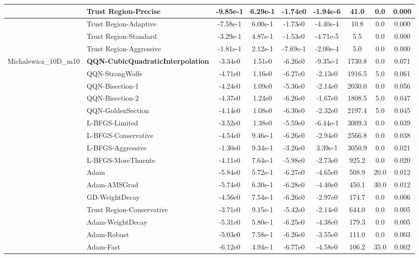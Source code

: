 \documentclass{article}
\begin{document}
\begin{longtable}{|l|l|c|c|c|c|c|c|c|}
\hline
 & Trust Region-Precise & -9.85e-1 & 6.29e-1 & -1.74e0 & -1.94e-6 & 41.0 & 0.0 & 0.000 \\
\hline
 & Trust Region-Adaptive & -7.58e-1 & 6.00e-1 & -1.73e0 & -4.40e-4 & 10.8 & 0.0 & 0.000 \\
\hline
 & Trust Region-Standard & -3.29e-1 & 4.87e-1 & -1.53e0 & -4.71e-5 & 5.5 & 0.0 & 0.000 \\
\hline
 & Trust Region-Aggressive & -1.81e-1 & 2.12e-1 & -7.69e-1 & -2.00e-4 & 5.0 & 0.0 & 0.000 \\
Michalewicz\_10D\_m10 & \textbf{QQN-CubicQuadraticInterpolation} & -3.34e0 & 1.51e0 & -6.26e0 & -9.35e-1 & 1730.8 & 0.0 & 0.071 \\
\hline
 & QQN-StrongWolfe & -4.71e0 & 1.16e0 & -6.27e0 & -2.13e0 & 1916.5 & 5.0 & 0.061 \\
\hline
 & QQN-Bisection-1 & -4.24e0 & 1.09e0 & -5.36e0 & -2.14e0 & 2030.0 & 0.0 & 0.056 \\
\hline
 & QQN-Bisection-2 & -4.37e0 & 1.24e0 & -6.26e0 & -1.67e0 & 1808.5 & 5.0 & 0.047 \\
\hline
 & QQN-GoldenSection & -4.14e0 & 1.08e0 & -6.30e0 & -2.32e0 & 2197.4 & 5.0 & 0.045 \\
\hline
 & L-BFGS-Limited & -3.52e0 & 1.38e0 & -5.59e0 & -6.44e-1 & 3009.3 & 0.0 & 0.039 \\
\hline
 & L-BFGS-Conservative & -4.54e0 & 9.46e-1 & -6.26e0 & -2.94e0 & 2566.8 & 0.0 & 0.038 \\
\hline
 & L-BFGS-Aggressive & -1.30e0 & 9.34e-1 & -3.26e0 & 3.39e-1 & 3050.9 & 0.0 & 0.021 \\
\hline
 & L-BFGS-MoreThuente & -4.11e0 & 7.64e-1 & -5.98e0 & -2.73e0 & 925.2 & 0.0 & 0.020 \\
\hline
 & Adam & -5.84e0 & 5.72e-1 & -6.27e0 & -4.65e0 & 508.9 & 20.0 & 0.012 \\
\hline
 & Adam-AMSGrad & -5.74e0 & 6.30e-1 & -6.28e0 & -4.40e0 & 450.1 & 30.0 & 0.012 \\
\hline
 & GD-WeightDecay & -4.56e0 & 7.54e-1 & -6.26e0 & -2.97e0 & 174.7 & 0.0 & 0.006 \\
\hline
 & Trust Region-Conservative & -3.71e0 & 9.15e-1 & -5.42e0 & -2.14e0 & 644.0 & 0.0 & 0.005 \\
\hline
 & Adam-WeightDecay & -5.31e0 & 5.80e-1 & -6.25e0 & -4.38e0 & 179.3 & 0.0 & 0.005 \\
\hline
 & Adam-Robust & -5.03e0 & 7.58e-1 & -6.26e0 & -3.55e0 & 111.0 & 0.0 & 0.003 \\
\hline
 & Adam-Fast & -6.12e0 & 4.94e-1 & -6.77e0 & -4.58e0 & 106.2 & 35.0 & 0.002 \\

\end{longtable}
\end{document}
